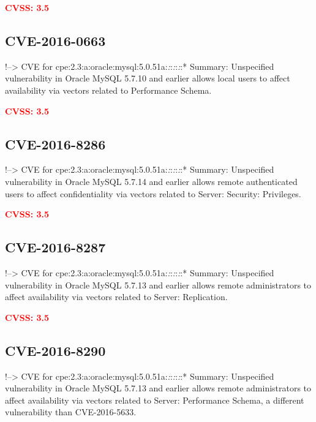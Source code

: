 \documentclass[a4paper, 12pt]{article}
\begin{document}
\textbf{\textcolor{red}{CVSS: 3.5}}

\hypertarget{cve-2016-0663}{%
\subsection{CVE-2016-0663}\label{cve-2016-0663}}

!--\textgreater{} CVE for
cpe:2.3:a:oracle:mysql:5.0.51a:\emph{:}:\emph{:}:\emph{:}:* Summary:
Unspecified vulnerability in Oracle MySQL 5.7.10 and earlier allows
local users to affect availability via vectors related to Performance
Schema.

\textbf{\textcolor{red}{CVSS: 3.5}}

\hypertarget{cve-2016-8286}{%
\subsection{CVE-2016-8286}\label{cve-2016-8286}}

!--\textgreater{} CVE for
cpe:2.3:a:oracle:mysql:5.0.51a:\emph{:}:\emph{:}:\emph{:}:* Summary:
Unspecified vulnerability in Oracle MySQL 5.7.14 and earlier allows
remote authenticated users to affect confidentiality via vectors related
to Server: Security: Privileges.

\textbf{\textcolor{red}{CVSS: 3.5}}

\hypertarget{cve-2016-8287}{%
\subsection{CVE-2016-8287}\label{cve-2016-8287}}

!--\textgreater{} CVE for
cpe:2.3:a:oracle:mysql:5.0.51a:\emph{:}:\emph{:}:\emph{:}:* Summary:
Unspecified vulnerability in Oracle MySQL 5.7.13 and earlier allows
remote administrators to affect availability via vectors related to
Server: Replication.

\textbf{\textcolor{red}{CVSS: 3.5}}

\hypertarget{cve-2016-8290}{%
\subsection{CVE-2016-8290}\label{cve-2016-8290}}

!--\textgreater{} CVE for
cpe:2.3:a:oracle:mysql:5.0.51a:\emph{:}:\emph{:}:\emph{:}:* Summary:
Unspecified vulnerability in Oracle MySQL 5.7.13 and earlier allows
remote administrators to affect availability via vectors related to
Server: Performance Schema, a different vulnerability than
CVE-2016-5633.
\end{document}
